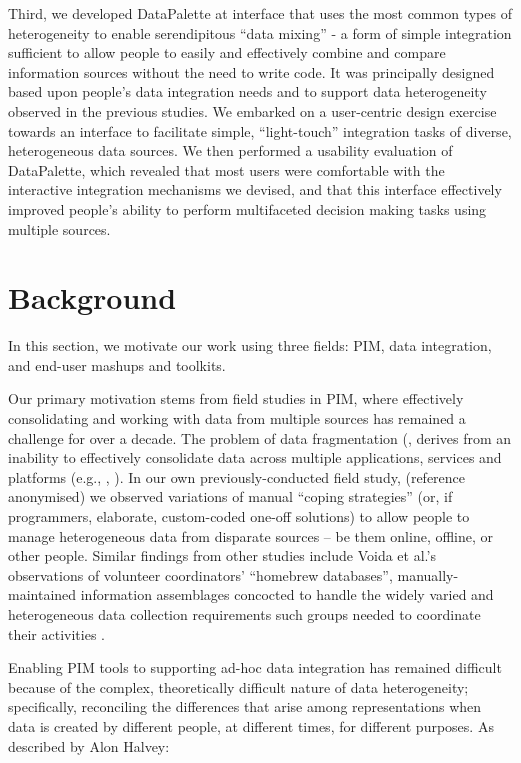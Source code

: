 \documentclass{sigchi}
\begin{document}
Third, we developed DataPalette at interface that uses the most common types of heterogeneity to enable serendipitous ``data mixing'' - a form of simple integration sufficient to allow people to easily and effectively combine and compare information sources without the need to write code.  It was principally designed based upon people's data integration needs and to support data heterogeneity observed in the previous studies.  We embarked on a user-centric design exercise towards an interface to facilitate simple, ``light-touch'' integration tasks of diverse, heterogeneous data sources.  We then performed a usability evaluation of DataPalette, which revealed that most users were comfortable with the interactive integration mechanisms we devised, and that this interface effectively improved people's ability to perform multifaceted decision making tasks using multiple sources.

\section{Background}

In this section, we motivate our work using three fields: PIM, data integration, and end-user mashups and toolkits.

Our primary motivation stems from field studies in PIM, where effectively consolidating and working with data from multiple sources has remained a challenge for over a decade. The problem of data fragmentation (\cite{Jones05towardsa}, derives from an inability to effectively consolidate data across multiple applications, services and platforms (e.g., \cite{bergman}, \cite{boardmansasse}). In our own previously-conducted field study, (reference anonymised) we observed variations of manual ``coping strategies'' (or, if programmers, elaborate, custom-coded one-off solutions) to allow people to manage heterogeneous data from disparate sources -- be them online, offline, or other people.  Similar findings from other studies include Voida et al.'s observations of volunteer coordinators' ``homebrew databases'', manually-maintained information assemblages concocted to handle the widely varied and heterogeneous data collection requirements such groups needed to coordinate their activities \cite{Voida:2011:HDC:1978942.1979078}.

Enabling PIM tools to supporting ad-hoc data integration has remained difficult because of the complex, theoretically difficult nature of data heterogeneity; specifically, reconciling the differences that arise among representations when data is created by different people, at different times, for different purposes. As described by Alon Halvey:
\end{document}
